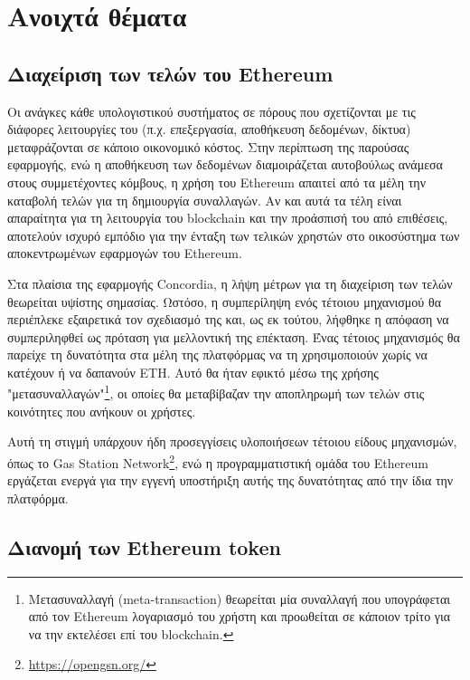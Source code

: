 \section{Ανοιχτά θέματα}\label{section:5-2-open-areas}

\subsection{Διαχείριση των τελών του Ethereum}\label{subsection:5-2-1-ethereum-fees-management}

Οι ανάγκες κάθε υπολογιστικού συστήματος σε πόρους που σχετίζονται με τις διάφορες λειτουργίες του (π.χ. επεξεργασία, αποθήκευση δεδομένων, δίκτυα) μεταφράζονται σε κάποιο οικονομικό κόστος. Στην περίπτωση της παρούσας εφαρμογής, ενώ η αποθήκευση των δεδομένων διαμοιράζεται αυτοβούλως ανάμεσα στους συμμετέχοντες κόμβους, η χρήση του Ethereum απαιτεί από τα μέλη την καταβολή τελών για τη δημιουργία συναλλαγών. Αν και αυτά τα τέλη είναι απαραίτητα για τη λειτουργία του blockchain και την προάσπισή του από επιθέσεις, αποτελούν ισχυρό εμπόδιο για την ένταξη των τελικών χρηστών στο οικοσύστημα των αποκεντρωμένων εφαρμογών του Ethereum.

Στα πλαίσια της εφαρμογής Concordia, η λήψη μέτρων για τη διαχείριση των τελών θεωρείται υψίστης σημασίας. Ωστόσο, η συμπερίληψη ενός τέτοιου μηχανισμού θα περιέπλεκε εξαιρετικά τον σχεδιασμό της και, ως εκ τούτου, λήφθηκε η απόφαση να συμπεριληφθεί ως πρόταση για μελλοντική της επέκταση. Ένας τέτοιος μηχανισμός θα παρείχε τη δυνατότητα στα μέλη της πλατφόρμας να τη χρησιμοποιούν χωρίς να κατέχουν ή να δαπανούν ETH. Αυτό θα ήταν εφικτό μέσω της χρήσης "μετασυναλλαγών"\footnote{Μετασυναλλαγή (meta-transaction) θεωρείται μία συναλλαγή που υπογράφεται από τον Ethereum λογαριασμό του χρήστη και προωθείται σε κάποιον τρίτο για να την εκτελέσει επί του blockchain.}, οι οποίες θα μεταβίβαζαν την αποπληρωμή των τελών στις κοινότητες που ανήκουν οι χρήστες.

Αυτή τη στιγμή υπάρχουν ήδη προσεγγίσεις υλοποιήσεων τέτοιου είδους μηχανισμών, όπως το Gas Station Network\footnote{\url{https://opengsn.org/}}, ενώ η προγραμματιστική ομάδα του Ethereum εργάζεται ενεργά για την εγγενή υποστήριξη αυτής της δυνατότητας από την ίδια την πλατφόρμα.

\subsection{Διανομή των Ethereum token}\label{subsection:5-2-2-token-distribution}

